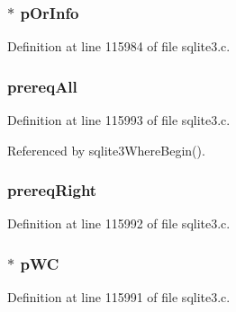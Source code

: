 \subsubsection[{p\+Or\+Info}]{$\ast$ p\+Or\+Info}\label{struct_where_term_a233fab5761379ed04adf6c216578c81a}


Definition at line 115984 of file sqlite3.\+c.

\hypertarget{struct_where_term_ae4bf473a378401a7052787c59b4a6e3a}{}
\subsubsection[{prereq\+All}]{ prereq\+All}\label{struct_where_term_ae4bf473a378401a7052787c59b4a6e3a}


Definition at line 115993 of file sqlite3.\+c.



Referenced by sqlite3\+Where\+Begin().

\hypertarget{struct_where_term_a327b0c75e6d1aabcd5ca7fafae1be2db}{}
\subsubsection[{prereq\+Right}]{ prereq\+Right}\label{struct_where_term_a327b0c75e6d1aabcd5ca7fafae1be2db}


Definition at line 115992 of file sqlite3.\+c.

\hypertarget{struct_where_term_ab85657232a3c235326f1e0dd179e32b7}{}
\subsubsection[{p\+W\+C}]{$\ast$ p\+W\+C}\label{struct_where_term_ab85657232a3c235326f1e0dd179e32b7}


Definition at line 115991 of file sqlite3.\+c.

\hypertarget{struct_where_term_ada1f7e88cbf8154b8f353eb87f753e95}{}
